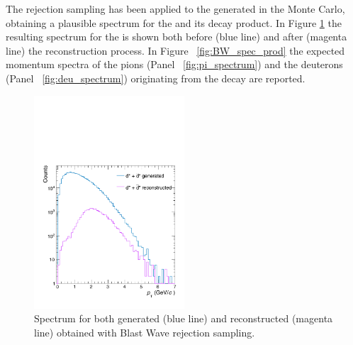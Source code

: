 The rejection sampling has been applied to the \ds generated in the Monte Carlo, obtaining a 
plausible \pt spectrum for the \ds and its decay product. In Figure \ref{fig:bw_spectrum} the
resulting \pt spectrum for the \ds is shown both before (blue line) and after (magenta line) the
reconstruction process. 
In Figure ~\ref{fig:BW_spec_prod} the expected momentum spectra of the pions 
(Panel ~\ref{fig:pi_spectrum}) and the deuterons (Panel ~\ref{fig:deu_spectrum}) originating from
the \ds decay are reported.

\begin{figure}
    \centering
    \includegraphics[width=0.5\textwidth]{gfx/genrecBW}
	\caption{Spectrum for both generated (blue line) and reconstructed (magenta line) \ds obtained with Blast Wave rejection sampling.}
	\label{fig:bw_spectrum}
\end{figure}


